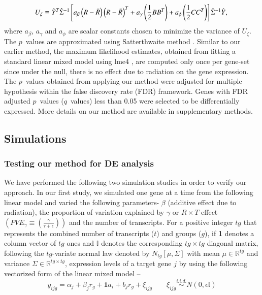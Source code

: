\documentclass[hidelinks,11pt]{article}
\begin{document}
\begin{equation}
U_\zeta \equiv \hat{Y}^T  \hat{\Sigma}^{-1} \left[ a_\beta \left(R - \bar{R} \right) \left(R - \bar{R} \right)^T   + a_\gamma \left( \frac{1}{2} B B^T \right) + a_\phi \left( \frac{1}{2} C C^T \right) \right]  \hat{\Sigma}^{-1} \hat{Y}, \\
\end{equation}
where ${a_\beta}$, ${a_\gamma}$ and ${a_\phi}$ are scalar constants chosen to minimize the variance of $U_\zeta$. The $p$~values are approximated using Satterthwaite method \cite{satterthwaite}. Similar to our earlier method, the maximum likelihood estimates, obtained from fitting a standard linear mixed model using lme4 \cite{lme4}, are computed only once per gene-set since under the null, there is no effect due to radiation on the gene expression. The $p$~values obtained from applying our method were adjusted for multiple hypothesis within the false discovery rate (FDR) framework. Genes with FDR adjusted $p$~values ($q$~values) less than 0.05 were selected to be differentially expressed. More details on our method are available in supplementary methods. 

\subsection*{Simulations}

\subsubsection*{Testing our method for DE analysis}

We have performed the following two simulation studies in order to verify our approach. In our first study, we simulated one gene at a time from the following linear model and varied the following parameters- $\beta$ (additive effect due to radiation), the proportion of variation explained by $\gamma$ or $R \times T$ effect $\left( PVE_{\gamma} \equiv \left(\frac{\gamma}{\tau + \epsilon}\right) \right)$ and the number of transcripts. For a positive integer $tg$ that represents the combined number of transcripts ($t$) and groups ($g$), if \textbf{1} denotes a column vector of $tg$ ones and $\mathbb{I}$ denotes the corresponding $tg \times tg$ diagonal matrix, following the $tg$-variate normal law denoted by $N_{tg}\left[\mu,\Sigma\right]$ with mean $\mu \in \mathbb{R}^{tg}$ and variance $\Sigma \in \mathbb{R}^{tg \times tg}$, expression levels of a target gene $j$ by using the following vectorized form of the linear mixed model --
\begin{equation}
y_{ijg} = \alpha_{j} + \beta_{j} r_{g} + \textbf{1} a_i + b_{j} r_{g} + \xi_{ijg} \qquad \xi_{ijg}  \overset{i.i.d.} \sim N \left( 0, \epsilon\mathbb{I} \right)
\end{equation}
\end{document}
